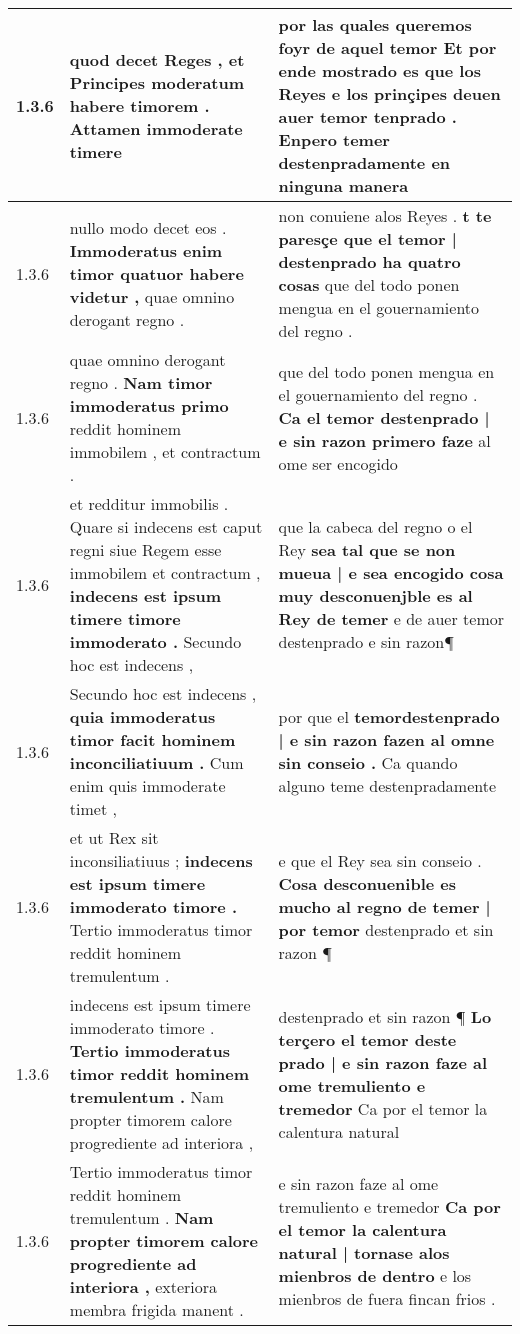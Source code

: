 \begin{tabular}{|p{1cm}|p{6.5cm}|p{6.5cm}|}
1.3.6 & quod decet Reges , \textbf{ et Principes moderatum habere timorem . } Attamen immoderate timere & por las quales queremos foyr de aquel temor \textbf{ Et por ende mostrado es que los Reyes e los prinçipes deuen auer temor tenprado . } Enpero temer destenpradamente en ninguna manera \\\hline
1.3.6 & nullo modo decet eos . \textbf{ Immoderatus enim timor quatuor habere videtur , } quae omnino derogant regno . & non conuiene alos Reyes . \textbf{ t te paresçe que el temor | destenprado ha quatro cosas } que del todo ponen mengua en el gouernamiento del regno . \\\hline
1.3.6 & quae omnino derogant regno . \textbf{ Nam timor immoderatus primo } reddit hominem immobilem , et contractum . & que del todo ponen mengua en el gouernamiento del regno . \textbf{ Ca el temor destenprado | e sin razon primero faze } al ome ser encogido \\\hline
1.3.6 & et redditur immobilis . Quare si indecens est caput regni siue Regem esse immobilem et contractum , \textbf{ indecens est ipsum timere timore immoderato . } Secundo hoc est indecens , & que la cabeca del regno o el Rey \textbf{ sea tal que se non mueua | e sea encogido cosa muy desconuenjble es al Rey de temer } e de auer temor destenprado e sin razon¶ \\\hline
1.3.6 & Secundo hoc est indecens , \textbf{ quia immoderatus timor facit hominem inconciliatiuum . } Cum enim quis immoderate timet , & por que el \textbf{ temordestenprado | e sin razon fazen al omne sin conseio . } Ca quando alguno teme destenpradamente \\\hline
1.3.6 & et ut Rex sit inconsiliatiuus ; \textbf{ indecens est ipsum timere immoderato timore . } Tertio immoderatus timor reddit hominem tremulentum . & e que el Rey sea sin conseio . \textbf{ Cosa desconuenible es mucho al regno de temer | por temor } destenprado et sin razon ¶ \\\hline
1.3.6 & indecens est ipsum timere immoderato timore . \textbf{ Tertio immoderatus timor reddit hominem tremulentum . } Nam propter timorem calore progrediente ad interiora , & destenprado et sin razon ¶ \textbf{ Lo terçero el temor deste prado | e sin razon faze al ome tremuliento e tremedor } Ca por el temor la calentura natural \\\hline
1.3.6 & Tertio immoderatus timor reddit hominem tremulentum . \textbf{ Nam propter timorem calore progrediente ad interiora , } exteriora membra frigida manent . & e sin razon faze al ome tremuliento e tremedor \textbf{ Ca por el temor la calentura natural | tornase alos mienbros de dentro } e los mienbros de fuera fincan frios . \\\hline

\end{tabular}
